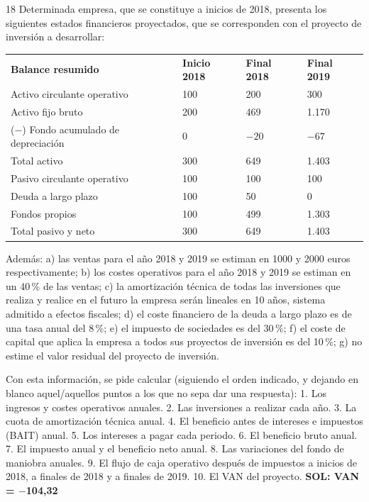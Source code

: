 \documentclass[10pt,a4paper,twoside]{article}
\newcommand{\eur}{\,\text{€}\xspace}
\newcommand{\thead}[1]{\leavevmode\sffamily\bfseries\color{white}#1}
\newcommand{\headrow}{\rowcolor{steel}}
\begin{document}
\begin{enunciado}{18}
Determinada empresa, que se constituye a inicios de 2018, presenta los siguientes estados financieros proyectados, que
se corresponden con el proyecto de inversión a desarrollar:

\begin{center}\small
\begin{tabularx}{0.76\linewidth}{@{}L QQQ@{}}
\headrow \thead{Balance resumido} & \thead{Inicio 2018} & \thead{Final 2018} & \thead{Final 2019}\\
Activo circulante operativo & 100 & 200 & 300\\
Activo fijo bruto & 200 & 469 & 1.170\\
($-$) Fondo acumulado de depreciación & 0 & $-20$ & $-67$\\
 Total activo & 300 & 649 & 1.403\\
Pasivo circulante operativo & 100 & 100 & 100\\
Deuda a largo plazo & 100 & 50 & 0\\
Fondos propios & 100 & 499 & 1.303\\
 Total pasivo y neto & 300 & 649 & 1.403\\
\end{tabularx}
\end{center}

Además: a) las ventas para el año 2018 y 2019 se estiman en 1000 y 2000 euros respectivamente; b) los costes operativos
para el año 2018 y 2019 se estiman en un 40\,\% de las ventas; c) la amortización técnica de todas las inversiones que
realiza y realice en el futuro la empresa serán lineales en 10 años, sistema admitido a efectos fiscales; d) el coste
financiero de la deuda a largo plazo es de una tasa anual del 8\,\%; e) el impuesto de sociedades es del 30\,\%; f) el
coste de capital que aplica la empresa a todos sus proyectos de inversión es del 10\,\%; g) no estime el valor residual
del proyecto de inversión.

Con esta información, se pide calcular (siguiendo el orden indicado, y dejando en blanco aquel/aquellos puntos a los
que no sepa dar una respuesta): 1. Los ingresos y costes operativos anuales. 2. Las inversiones a realizar cada año.
3. La cuota de amortización técnica anual. 4. El beneficio antes de intereses e impuestos (BAIT) anual. 5. Los intereses
a pagar cada periodo. 6. El beneficio bruto anual. 7. El impuesto anual y el beneficio neto anual. 8. Las variaciones
del fondo de maniobra anuales. 9. El flujo de caja operativo después de impuestos a inicios de 2018, a finales de 2018
y a finales de 2019. 10. El VAN del proyecto. \textbf{SOL: VAN = $-$104,32\eur}
\end{enunciado}
\end{document}
